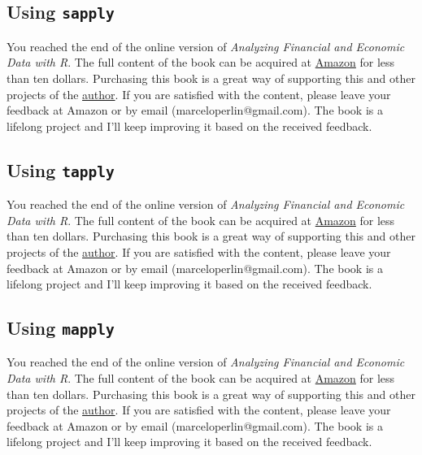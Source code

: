 \documentclass[
  12pt,
]{book}
\newenvironment{pleasebuyit}
{\begin{noteblock}
		
	} {\end{noteblock}}
\begin{document}
\hypertarget{using-sapply}{%
\subsection{\texorpdfstring{Using \texttt{sapply}}{Using sapply}}\label{using-sapply}}

\begin{pleasebuyit}
You reached the end of the online version of \emph{Analyzing Financial
and Economic Data with R}. The full content of the book can be acquired
at \href{https://www.amazon.com/dp/B084LSNXMN}{Amazon} for less than ten
dollars. Purchasing this book is a great way of supporting this and
other projects of the \href{https://www.msperlin.com/}{author}. If you
are satisfied with the content, please leave your feedback at Amazon or
by email (marceloperlin@gmail.com). The book is a lifelong project and
I'll keep improving it based on the received feedback.
\end{pleasebuyit}

\hypertarget{using-tapply}{%
\subsection{\texorpdfstring{Using \texttt{tapply}}{Using tapply}}\label{using-tapply}}

\begin{pleasebuyit}
You reached the end of the online version of \emph{Analyzing Financial
and Economic Data with R}. The full content of the book can be acquired
at \href{https://www.amazon.com/dp/B084LSNXMN}{Amazon} for less than ten
dollars. Purchasing this book is a great way of supporting this and
other projects of the \href{https://www.msperlin.com/}{author}. If you
are satisfied with the content, please leave your feedback at Amazon or
by email (marceloperlin@gmail.com). The book is a lifelong project and
I'll keep improving it based on the received feedback.
\end{pleasebuyit}

\hypertarget{using-mapply}{%
\subsection{\texorpdfstring{Using \texttt{mapply}}{Using mapply}}\label{using-mapply}}

\begin{pleasebuyit}
You reached the end of the online version of \emph{Analyzing Financial
and Economic Data with R}. The full content of the book can be acquired
at \href{https://www.amazon.com/dp/B084LSNXMN}{Amazon} for less than ten
dollars. Purchasing this book is a great way of supporting this and
other projects of the \href{https://www.msperlin.com/}{author}. If you
are satisfied with the content, please leave your feedback at Amazon or
by email (marceloperlin@gmail.com). The book is a lifelong project and
I'll keep improving it based on the received feedback.
\end{pleasebuyit}
\end{document}
